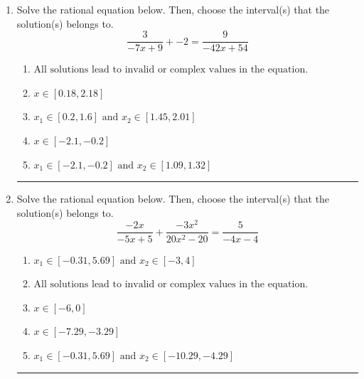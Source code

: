 \documentclass[14pt]{extbook}
\newcommand{\litem}[1]{\item#1\hspace*{-1cm}\rule{\textwidth}{0.4pt}}
\begin{document}
\begin{enumerate}
\litem{
Solve the rational equation below. Then, choose the interval(s) that the solution(s) belongs to.\[ \frac{3}{-7x + 9} + -2 = \frac{9}{-42x + 54} \]\begin{enumerate}[label=\Alph*.]
\item \( \text{All solutions lead to invalid or complex values in the equation.} \)
\item \( x \in [0.18,2.18] \)
\item \( x_1 \in [0.2, 1.6] \text{ and } x_2 \in [1.45,2.01] \)
\item \( x \in [-2.1,-0.2] \)
\item \( x_1 \in [-2.1, -0.2] \text{ and } x_2 \in [1.09,1.32] \)

\end{enumerate} }
\litem{
Solve the rational equation below. Then, choose the interval(s) that the solution(s) belongs to.\[ \frac{-2x}{-5x + 5} + \frac{-3x^{2}}{20x^{2} -20} = \frac{5}{-4x -4} \]\begin{enumerate}[label=\Alph*.]
\item \( x_1 \in [-0.31, 5.69] \text{ and } x_2 \in [-3,4] \)
\item \( \text{All solutions lead to invalid or complex values in the equation.} \)
\item \( x \in [-6,0] \)
\item \( x \in [-7.29,-3.29] \)
\item \( x_1 \in [-0.31, 5.69] \text{ and } x_2 \in [-10.29,-4.29] \)


\end{enumerate}}
\end{enumerate}
\end{document}
